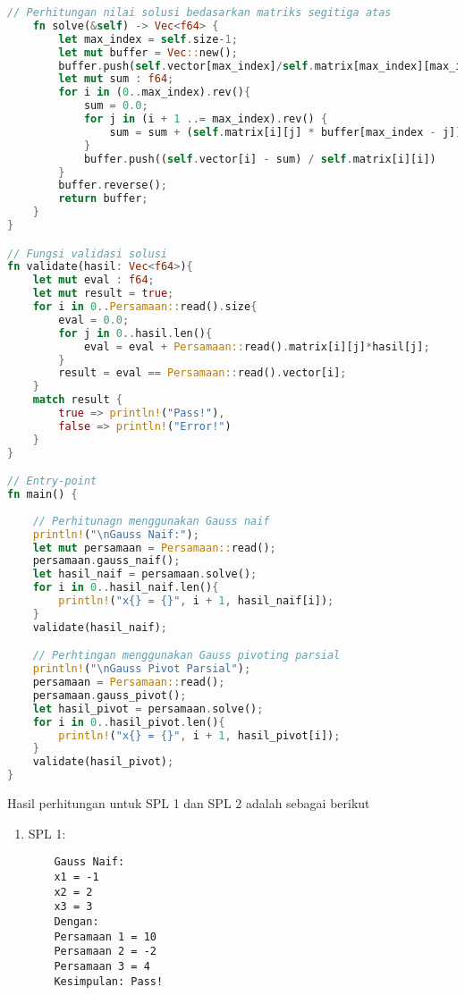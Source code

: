 \documentclass[12pt]{article}
\begin{document}
\begin{enumerate}
{\begin{lstlisting}[language=Rust, style=colouredRust, basicstyle=\fontsize{7.5pt}{10pt}\selectfont\color{white}\ttfamily]
    // Perhitungan nilai solusi bedasarkan matriks segitiga atas
    fn solve(&self) -> Vec<f64> {
        let max_index = self.size-1;
        let mut buffer = Vec::new();
        buffer.push(self.vector[max_index]/self.matrix[max_index][max_index]);
        let mut sum : f64;
        for i in (0..max_index).rev(){
            sum = 0.0;
            for j in (i + 1 ..= max_index).rev() {
                sum = sum + (self.matrix[i][j] * buffer[max_index - j]);
            }
            buffer.push((self.vector[i] - sum) / self.matrix[i][i])
        }
        buffer.reverse();
        return buffer;
    }
}

// Fungsi validasi solusi
fn validate(hasil: Vec<f64>){
    let mut eval : f64;
    let mut result = true;
    for i in 0..Persamaan::read().size{
        eval = 0.0;
        for j in 0..hasil.len(){
            eval = eval + Persamaan::read().matrix[i][j]*hasil[j];
        }
        result = eval == Persamaan::read().vector[i];
    }
    match result {
        true => println!("Pass!"),
        false => println!("Error!")
    }
}

// Entry-point
fn main() {
    
    // Perhitunagn menggunakan Gauss naif
    println!("\nGauss Naif:");
    let mut persamaan = Persamaan::read();
    persamaan.gauss_naif();
    let hasil_naif = persamaan.solve();
    for i in 0..hasil_naif.len(){
        println!("x{} = {}", i + 1, hasil_naif[i]);
    }
    validate(hasil_naif);

    // Perhtingan menggunakan Gauss pivoting parsial
    println!("\nGauss Pivot Parsial");
    persamaan = Persamaan::read();
    persamaan.gauss_pivot();
    let hasil_pivot = persamaan.solve();
    for i in 0..hasil_pivot.len(){
        println!("x{} = {}", i + 1, hasil_pivot[i]);
    }
    validate(hasil_pivot);
}
        \end{lstlisting}
        Hasil perhitungan untuk SPL 1 dan SPL 2 adalah sebagai berikut
        \begin{enumerate}
            \item {
                SPL 1:
                \begin{lstlisting}
    Gauss Naif:
    x1 = -1
    x2 = 2
    x3 = 3
    Dengan:
    Persamaan 1 = 10
    Persamaan 2 = -2
    Persamaan 3 = 4
    Kesimpulan: Pass!


\end{lstlisting}}
\end{enumerate}}
\end{enumerate}
\end{document}
